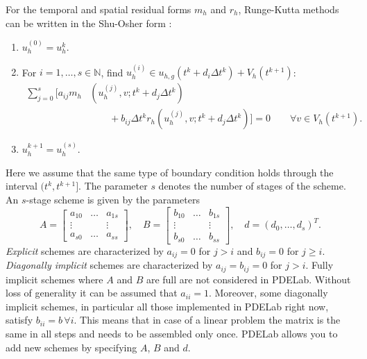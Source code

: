 \documentclass[a4paper,12pt]{article}
\begin{document}
For the temporal and spatial residual forms $m_h$ and $r_h$, Runge-Kutta
methods can be written in the Shu-Osher form
\cite{shu_osher_88,gottlieb2011strong}:
\begin{enumerate}
\item $u_h^{(0)} = u_h^{k}$.
\item For $i=1,\ldots,s\in\mathbb{N}$, find $u_h^{(i)}\in u_{h,g}(t^k+d_i \Delta t^k)
+ V_h(t^{k+1})$:
\begin{equation*}
\begin{split}
\sum\limits_{j=0}^{s} \biggl[a_{ij} m_h&\left(u_h^{(j)},v;t^k+d_j \Delta t^k\right) \\
&\qquad + b_{ij} \Delta t^k r_h\left(u_h^{(j)}, v;t^k+d_j \Delta t^k\right) \biggr] = 0
\qquad \forall v\in V_h(t^{k+1}).
\end{split}
\end{equation*}
\item $u_h^{k+1} = u_h^{(s)}$.
\end{enumerate}
Here we assume that the same type of boundary condition
holds through the interval $(t^k,t^{k+1}]$. The parameter $s$ denotes
the number of stages of the scheme.
An $s$-stage scheme is given by the parameters
\begin{equation*}
A = \left[\begin{array}{ccc}
a_{10} & \ldots & a_{1s}\\
\vdots &  & \vdots\\
a_{s0} & \ldots & a_{ss}
\end{array}\right],
\quad B = \left[\begin{array}{ccc}
b_{10} & \ldots & b_{1s}\\
\vdots &  & \vdots\\
b_{s0} & \ldots & b_{ss}
\end{array}\right],
\quad d = \left(
d_{0}, \ldots, d_{s}
\right)^T.
\end{equation*}
\textit{Explicit} schemes are characterized by $a_{ij} = 0$ for $j>i$ and $b_{ij}=0$ for $j\geq i$.
\textit{Diagonally implicit} schemes are characterized by $a_{ij} = b_{ij}= 0$ for $j>i$.
Fully implicit schemes where $A$ and $B$ are full are not considered in PDELab.
Without loss of generality it can be assumed that $a_{ii}=1$. Moreover,
some diagonally implicit schemes, in particular all those implemented in PDELab right
now, satisfy $b_{ii}=b\,\forall i$. This means that in case of a linear problem the matrix is the
same in all steps and needs to be assembled only once.
PDELab allows you to add new schemes by specifying $A$, $B$ and $d$.
\end{document}
